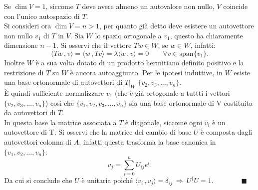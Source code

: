 \documentclass{article}
\begin{document}
Se $\dim V=1$, siccome $T$ deve avere almeno un autovalore non nullo, $V$ coincide con l'unico autospazio di $T$.\\

Si consideri ora $\dim V=n>1$, per quanto già detto deve esistere un autovettore non nullo $v_1$ di $T$ in $V$. Sia $W$ lo spazio ortogonale a $v_1$, questo ha chiaramente dimensione $n-1$. Si osservi che il vettore $Tw\in W$, se $w\in W$, infatti:
\begin{equation*}
    \langle Tw\,, v\rangle=\langle w\,, Tv\rangle=\lambda\langle w\,, v\rangle=0\qquad\forall v\in \text{span}\{v_1\}.
\end{equation*}
Inoltre $W$ è a sua volta dotato di un prodotto hermitiano definito positivo e la restrizione di $T$ su $W$ è ancora autoaggiunto. Per le ipotesi induttive, in $W$ esiste una base ortonormale di autovettori di $T\big|_{W}$ $\{v_2,v_3,...,v_n\}$.\\

È quindi sufficiente normalizzare $v_1$ (che è già ortogonale a tuttti i vettori $\{v_2,v_3,...,v_n\}$) così che $\{v_1,v_2,v_3,...,v_n\}$ sia una base ortonormale di V costituita da autovettori di $T$.\\

In questa base la matrice associata a $T$ è diagonale, siccome ogni $v_i$ è un autovettore di T. Si osservi che la matrice del cambio di base $U$ è composta dagli autovettori colonna di $A$, infatti questa trasforma la base canonica in $\{v_1,v_2,\dots,v_n\}$:
\begin{equation*}
   v_j=\sum_{i=0}^{n} U_{ij}e^i.
\end{equation*}
Da cui si conclude che $U$ è unitaria poiché $\langle v_i\,, v_j\rangle=\delta_{ij}\ \Rightarrow\ U^\dagger U=1.\qquad\qquad \blacksquare$
\end{document}
